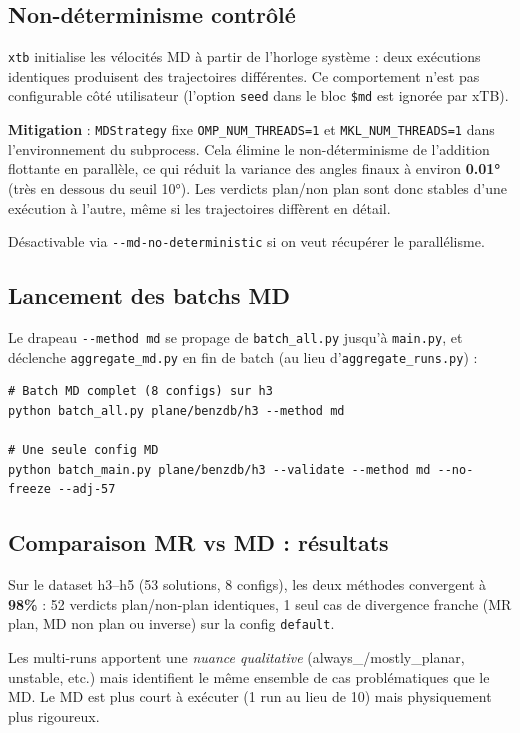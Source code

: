 \documentclass[12pt,a4paper]{article}
\theoremstyle{definition}
\begin{document}
\subsection{Non-déterminisme contrôlé}

\texttt{xtb} initialise les vélocités MD à partir de l'horloge système : deux exécutions
identiques produisent des trajectoires différentes. Ce comportement n'est pas configurable
côté utilisateur (l'option \texttt{seed} dans le bloc \texttt{\$md} est ignorée par xTB).

\textbf{Mitigation} : \texttt{MDStrategy} fixe \texttt{OMP\_NUM\_THREADS=1} et
\texttt{MKL\_NUM\_THREADS=1} dans l'environnement du subprocess. Cela élimine
le non-déterminisme de l'addition flottante en parallèle, ce qui réduit la variance
des angles finaux à environ \textbf{0.01°} (très en dessous du seuil 10°). Les verdicts
plan/non plan sont donc stables d'une exécution à l'autre, même si les trajectoires
diffèrent en détail.

Désactivable via \texttt{-{}-md-no-deterministic} si on veut récupérer le parallélisme.

\subsection{Lancement des batchs MD}

Le drapeau \texttt{-{}-method md} se propage de \texttt{batch\_all.py} jusqu'à
\texttt{main.py}, et déclenche \texttt{aggregate\_md.py} en fin de batch (au lieu
d'\texttt{aggregate\_runs.py}) :

\begin{lstlisting}[style=benzai]
# Batch MD complet (8 configs) sur h3
python batch_all.py plane/benzdb/h3 --method md

# Une seule config MD
python batch_main.py plane/benzdb/h3 --validate --method md --no-freeze --adj-57
\end{lstlisting}

\subsection{Comparaison MR vs MD : résultats}

Sur le dataset h3--h5 (53 solutions, 8 configs), les deux méthodes convergent à
\textbf{98\%} : 52 verdicts plan/non-plan identiques, 1 seul cas de divergence franche
(MR plan, MD non plan ou inverse) sur la config \texttt{default}.

Les multi-runs apportent une \emph{nuance qualitative} (always\_/mostly\_planar,
unstable, etc.) mais identifient le même ensemble de cas problématiques que le MD.
Le MD est plus court à exécuter (1 run au lieu de 10) mais physiquement plus rigoureux.
\end{document}
